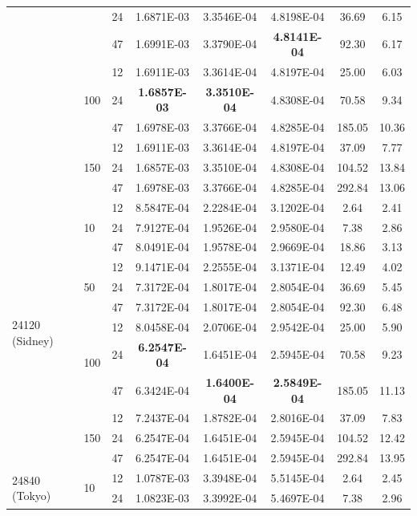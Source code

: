 \begin{table}[ht!]
\begin{center}
\begin{tabular}{|l|l|l|c|c|c|c|c|}
 && 24 & 1.6871E-03 & 3.3546E-04 & 4.8198E-04 & 36.69 & 6.15 \\
 && 47 & 1.6991E-03 & 3.3790E-04 & \textbf{4.8141E-04} & 92.30 & 6.17 \\
 \cline{2-8} 
 & \multirow{3}{*}{100} 
 &  12&  1.6911E-03 & 3.3614E-04 & 4.8197E-04 & 25.00 & 6.03 \\ 
 && 24 & \textbf{1.6857E-03} & \textbf{3.3510E-04} & 4.8308E-04 & 70.58 & 9.34 \\ 
 && 47 & 1.6978E-03 & 3.3766E-04 & 4.8285E-04 & 185.05 & 10.36 \\
 \cline{2-8} 
 & \multirow{3}{*}{150} 
 &  12& 1.6911E-03 & 3.3614E-04 & 4.8197E-04 & 37.09 & 7.77 \\   
 && 24 &1.6857E-03 & 3.3510E-04 & 4.8308E-04 & 104.52 & 13.84 \\
 && 47 &1.6978E-03 & 3.3766E-04 & 4.8285E-04 & 292.84 & 13.06 \\
\hline
\hline
 \multirow{12}{*}{24120 (Sidney)} &
 \multirow{3}{*}{10} 
  &  12 & 8.5847E-04 & 2.2284E-04 & 3.1202E-04 & 2.64 & 2.41 \\ 
 &&  24 & 7.9127E-04 & 1.9526E-04 & 2.9580E-04 & 7.38 & 2.86 \\ 
 &&  47 & 8.0491E-04 & 1.9578E-04 & 2.9669E-04 & 18.86 & 3.13 \\ 
 \cline{2-8} 
 & \multirow{3}{*}{50} 
 &  12& 9.1471E-04 & 2.2555E-04 & 3.1371E-04 & 12.49 & 4.02 \\ 
 && 24 &7.3172E-04 & 1.8017E-04 & 2.8054E-04 & 36.69 & 5.45 \\
 && 47 &7.3172E-04 & 1.8017E-04 & 2.8054E-04 & 92.30 & 6.48 \\
 \cline{2-8} 
 & \multirow{3}{*}{100} 
 &  12& 8.0458E-04 & 2.0706E-04 & 2.9542E-04 & 25.00 & 5.90 \\ 
 && 24 &\textbf{6.2547E-04} & 1.6451E-04 & 2.5945E-04 & 70.58 & 9.23 \\ 
 && 47 &6.3424E-04 & \textbf{1.6400E-04} & \textbf{2.5849E-04} & 185.05 & 11.13 \\
 \cline{2-8} 
 & \multirow{3}{*}{150} 
 &  12&  7.2437E-04 & 1.8782E-04 & 2.8016E-04 & 37.09 & 7.83 \\ 
 && 24 & 6.2547E-04 & 1.6451E-04 & 2.5945E-04 & 104.52 & 12.42 \\
 && 47 & 6.2547E-04 & 1.6451E-04 & 2.5945E-04 & 292.84 & 13.95 \\
\hline
\hline
 \multirow{12}{*}{24840 (Tokyo)} &
 \multirow{3}{*}{10} 
  &  12 & 1.0787E-03 & 3.3948E-04 & 5.5145E-04 & 2.64 & 2.45 \\ 
 &&  24 & 1.0823E-03 & 3.3992E-04 & 5.4697E-04 & 7.38 & 2.96 \\ 

\end{tabular}
\end{center}
\end{table}
